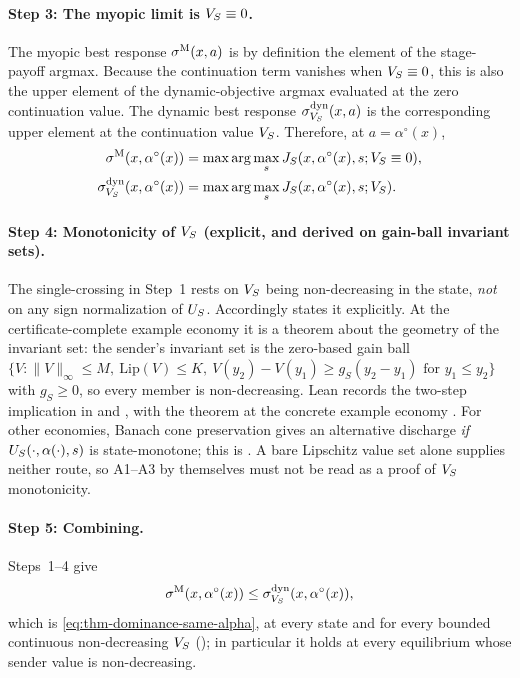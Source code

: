 \paragraph{Step 3: The myopic limit is $V_S\equiv0$.}
The myopic best response $\sigma^{\mathrm{M}}(x,a)$ is by definition the
element of the stage-payoff argmax. Because the continuation term
vanishes when $V_S\equiv0$, this is also the upper element of the
dynamic-objective argmax evaluated at the zero continuation value.
The dynamic best response $\sigma^{\mathrm{dyn}}_{V_S}(x,a)$ is the
corresponding upper element at the continuation value
$V_S$. Therefore, at $a=\alpha^{\circ}(x)$,
\[
\begin{aligned}
\sigma^{\mathrm{M}}(x,\alpha^{\circ}(x))
  &=\max\arg\max_s
    J_S(x,\alpha^{\circ}(x),s;V_S\equiv0),\\
\sigma^{\mathrm{dyn}}_{V_S}(x,\alpha^{\circ}(x))
  &=\max\arg\max_s
    J_S(x,\alpha^{\circ}(x),s;V_S).
\end{aligned}
\]

\paragraph{Step 4: Monotonicity of $V_S$ (explicit, and derived on gain-ball invariant sets).}
The single-crossing in Step~1 rests on $V_S$ being non-decreasing in the
state, \emph{not} on any sign normalization of $U_S$.  Accordingly
 states it explicitly.  At the certificate-complete
example economy it is a theorem about the geometry of the invariant set: the
sender's invariant set is the zero-based gain ball
$\{V:\lVert V\rVert_\infty\le M,\ \mathrm{Lip}(V)\le K,
\ V(y_2)-V(y_1)\ge g_S(y_2-y_1)\text{ for }y_1\le y_2\}$ with $g_S\ge0$, so
every member is
non-decreasing.  Lean records the two-step implication in
 and
,
with the theorem at the concrete example economy
.
For other economies, Banach cone preservation gives an alternative discharge
\emph{if} $U_S(\cdot,\alpha(\cdot),s)$ is state-monotone; this is
.  A bare Lipschitz value set
alone supplies neither route, so A1--A3 by themselves must not be read as a
proof of $V_S$ monotonicity.

\paragraph{Step 5: Combining.}
Steps~1--4 give
\[
\sigma^{\mathrm{M}}(x,\alpha^{\circ}(x))\le\sigma^{\mathrm{dyn}}_{V_S}(x,\alpha^{\circ}(x)),
\]
which is \eqref{eq:thm-dominance-same-alpha}, at every state and for every
bounded continuous non-decreasing $V_S$
(); in particular it
holds at every equilibrium whose sender value is non-decreasing.

